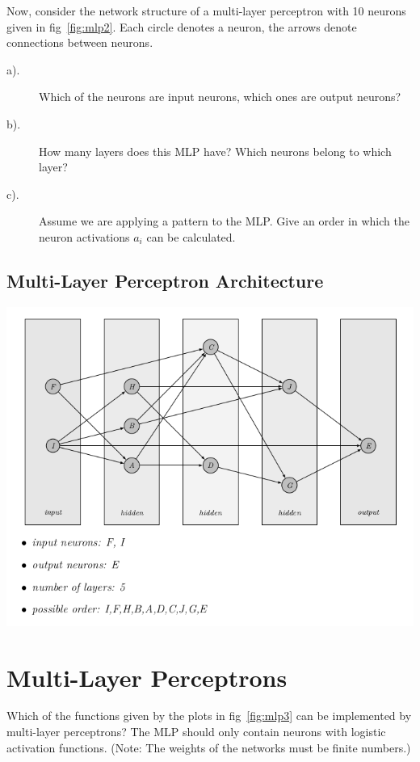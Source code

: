 \documentclass[12pt]{article}
\begin{document}
Now, consider the network structure of a multi-layer perceptron with 10 neurons given in
fig~\ref{fig:mlp2}. Each circle denotes a neuron, the arrows denote connections between neurons.
\begin{description}
	\item[a).]  Which of the neurons are input neurons, which ones are output neurons?
	\item[b).] How many layers does this MLP have? Which neurons belong to which layer?
	\item[c).] Assume we are applying a pattern to the MLP. Give an order in which the neuron
	      activations $a_i$ can be calculated.
\end{description}

\subsection{Multi-Layer Perceptron Architecture}

\begin{center}
	\includegraphics[width=.9\textwidth]{fig/2018-04-02-14-57-10.png}
\end{center}

\newpage
\section{Multi-Layer Perceptrons}

Which of the functions given by the plots in fig~\ref{fig:mlp3} can be implemented by multi-layer
perceptrons? The MLP should only contain neurons with logistic activation functions.
(Note: The weights of the networks must be finite numbers.)
\end{document}
